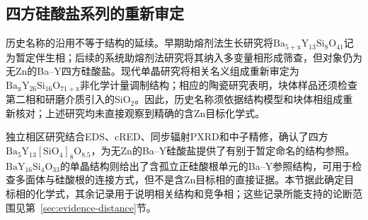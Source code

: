 \subsection{四方硅酸盐系列的重新审定}

历史名称的沿用不等于结构的延续。早期助熔剂法生长研究将$\mathrm{Ba_{5+x}Y_{13}Si_8O_{41}}$记为暂定伴生相\cite{kolitsch2009crystal}；后续的系统助熔剂法研究将其纳入多变量相形成筛查，但对象仍为无Zn的Ba--Y四方硅酸盐\cite{wierzbickawieczorek2017high}。现代单晶研究将相关名义组成重新审定为$\mathrm{Ba_xY_{26}Si_{16}O_{71+x}}$非化学计量调制结构\cite{yamane2024synthesis}；相应的陶瓷研究表明，块体样品还须检查第二相和研磨介质引入的SiO$_2$\CJKecglue{}\cite{yamane2024microstructure}。因此，历史名称须依据结构模型和块体相组成重新核对；上述研究均未直接观察到精确的含Zn目标化学式。

独立相区研究结合EDS、cRED、同步辐射PXRD和中子精修，确认了四方$\mathrm{Ba_5Y_{13}[SiO_4]_8O_{8.5}}$\CJKecglue{}\cite{gulay2024navigation}，为无Zn的Ba--Y硅酸盐提供了有别于暂定命名的结构参照。$\mathrm{BaY_{16}Si_4O_{33}}$的单晶结构则给出了含孤立正硅酸根单元的Ba--Y参照结构\cite{motozawa2022bay16si4o33}，可用于检查多面体与硅酸根的连接方式，但不是含Zn目标相的直接证据。本节据此确定目标相的化学式，其余记录用于说明相关结构和竞争相；这些记录所能支持的论断范围见第~\ref{sec:evidence-distance}\CJKecglue{}节。
